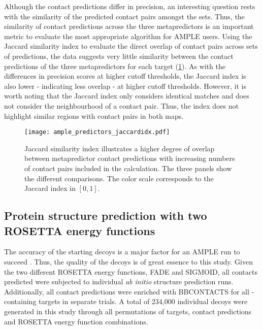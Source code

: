 Although the contact predictions differ in precision, an interesting question rests with the similarity of the predicted contact pairs amongst the sets. Thus, the similarity of contact predictions across the three metapredictors is an important metric to evaluate the most appropriate algorithm for AMPLE users. Using the Jaccard similarity index to evaluate the direct overlap of contact pairs across sets of predictions, the data suggests very little similarity between the contact predictions of the three metapredictors for each target (\cref{fig:ample_predictors_jaccardidx}). As with the differences in precision scores at higher cutoff thresholds, the Jaccard index is also lower - indicating less overlap - at higher cutoff thresholds. However, it is worth noting that the Jaccard index only considers identical matches and does not consider the neighbourhood of a contact pair. Thus, the index does not highlight similar regions with contact pairs in both maps.

\begin{figure}[H]
    \centering
    \texttt{[image: ample\_predictors\_jaccardidx.pdf]}
    \caption{Jaccard similarity index illustrates a higher degree of overlap between metapredictor contact predictions with increasing numbers of contact pairs included in the calculation. The three panels show the different comparisons. The color scale corresponds to the Jaccard index in $[0, 1]$.}
    \label{fig:ample_predictors_jaccardidx}
\end{figure}

\subsection{Protein structure prediction with two ROSETTA energy functions}
The accuracy of the starting decoys is a major factor for an AMPLE run to succeed \cite{Simkovic2016-jx, Thomas2017-lq}. Thus, the quality of the decoys is of great essence to this study. Given the two different ROSETTA energy functions, FADE and SIGMOID, all contacts predicted were subjected to individual \textit{ab initio} structure prediction runs. Additionally, all contact predictions were enriched with BBCONTACTS for all \textbeta-containing targets in separate trials. A total of 234,000 individual decoys were generated in this study through all permutations of targets, contact predictions and ROSETTA energy function combinations.

